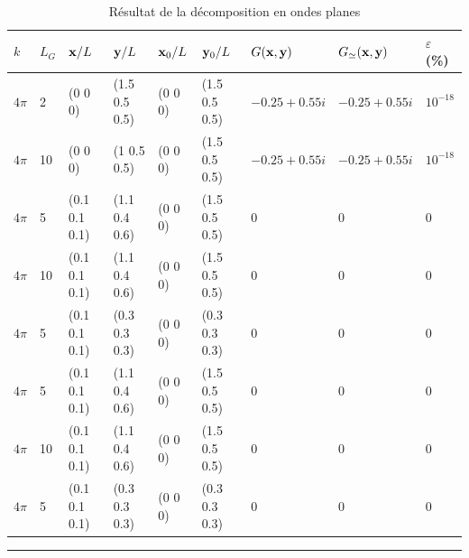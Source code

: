 \documentclass[10pt]{article}
\begin{document}
\begin{table}[H]
\centering
\begin{tabular}{m{0.5cm} m{0.5cm} | m{2cm} m{2cm} m{2cm} m{2cm} | m{2cm} m{2cm} m{1cm}} 
   \hline
    $k$ & $L_G$ & ${\bf x}/L$ & ${\bf y}/L$ & ${\bf x}_0/L$ & ${\bf y}_0/L$ & $G({\bf x}, {\bf y})$ & $G_{\simeq}({\bf x},{\bf y})$ & $\varepsilon$ (\%) \\
    \toprule
    \toprule
    $4\pi$ & 2 & (0 0 0) & (1.5 0.5 0.5) & (0 0 0) & (1.5 0.5 0.5) & $-0.25 + 0.55i$ & $-0.25 + 0.55i$ & $10^{-18}$\\
    $4\pi$ & 10 & (0 0 0) & (1 0.5 0.5) & (0 0 0) & (1.5 0.5 0.5) & $-0.25 + 0.55i$ & $-0.25 + 0.55i$ & $10^{-18}$\\ \hline
    $4\pi$ & 5 & (0.1 0.1 0.1) & (1.1 0.4 0.6) & (0 0 0) & (1.5 0.5 0.5) & 0 & 0 & 0\\
    $4\pi$ & 10 & (0.1 0.1 0.1) & (1.1 0.4 0.6) & (0 0 0) & (1.5 0.5 0.5) & 0 & 0 & 0\\ \hline
    $4\pi$ & 5 & (0.1 0.1 0.1) & (0.3 0.3 0.3) & (0 0 0) & (0.3 0.3 0.3) & 0 & 0 & 0\\
    $4\pi$ & 5 & (0.1 0.1 0.1) & (1.1 0.4 0.6) & (0 0 0) & (1.5 0.5 0.5) & 0 & 0 & 0\\
    $4\pi$ & 10 & (0.1 0.1 0.1) & (1.1 0.4 0.6) & (0 0 0) & (1.5 0.5 0.5) & 0 & 0 & 0\\ \hline
    $4\pi$ & 5 & (0.1 0.1 0.1) & (0.3 0.3 0.3) & (0 0 0) & (0.3 0.3 0.3) & 0 & 0 & 0\\
    \hline
\end{tabular}
\caption{Résultat de la décomposition en ondes planes}
\end{table}



\hfill\rule{8cm}{1pt}
\end{document}

